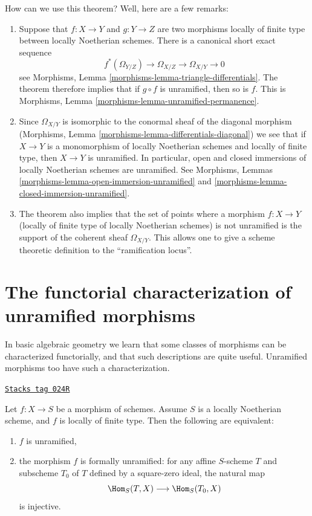 How can we use this theorem? Well, here are a few remarks:
\begin{enumerate}
\item Suppose that
$f : X \to Y$ and $g : Y \to Z$ are two morphisms locally of finite
type between locally Noetherian schemes. There is a canonical short
exact sequence
$$
f^*(\Omega_{Y/Z}) \to \Omega_{X/Z} \to \Omega_{X/Y} \to 0
$$
see Morphisms, Lemma \ref{morphisms-lemma-triangle-differentials}.
The theorem therefore implies that if $g \circ f$ is unramified,
then so is $f$. This is
Morphisms, Lemma \ref{morphisms-lemma-unramified-permanence}.
\item Since $\Omega_{X/Y}$ is isomorphic to the conormal sheaf
of the diagonal morphism
(Morphisms, Lemma \ref{morphisms-lemma-differentials-diagonal})
we see that if $X \to Y$ is a monomorphism of
locally Noetherian schemes and locally of finite type,
then $X \to Y$ is unramified.
In particular, open and closed immersions of locally Noetherian schemes
are unramified. See
Morphisms, Lemmas
\ref{morphisms-lemma-open-immersion-unramified} and
\ref{morphisms-lemma-closed-immersion-unramified}.
\item The theorem also implies that the set of points
where a morphism $f : X \to Y$ (locally of finite type of locally Noetherian
schemes) is not unramified is
the support of the coherent sheaf $\Omega_{X/Y}$.
This allows one to give a scheme theoretic definition to the
``ramification locus''.
\end{enumerate}

\section{The functorial characterization of unramified morphisms}
\label{etale-section-functorial-unramified}
In basic algebraic geometry we learn that some classes of morphisms can be
characterized functorially, and that such descriptions are quite useful.
Unramified morphisms too have such a characterization.

\begin{theorem}
\label{etale-theorem-formally-unramified}
\href{https://stacks.math.columbia.edu/tag/024R}{\texttt{Stacks tag 024R}}

Let $f : X \to S$ be a morphism of schemes.
Assume $S$ is a locally Noetherian scheme, and $f$ is locally of finite type.
Then the following are equivalent:
\begin{enumerate}
\item $f$ is unramified,
\item the morphism $f$ is formally unramified:
for any affine $S$-scheme $T$ and subscheme $T_0$ of $T$
defined by a square-zero ideal,
the natural map
$$
\Hom_S(T, X) \longrightarrow \Hom_S(T_0, X)
$$
is injective.
\end{enumerate}
\end{theorem}

